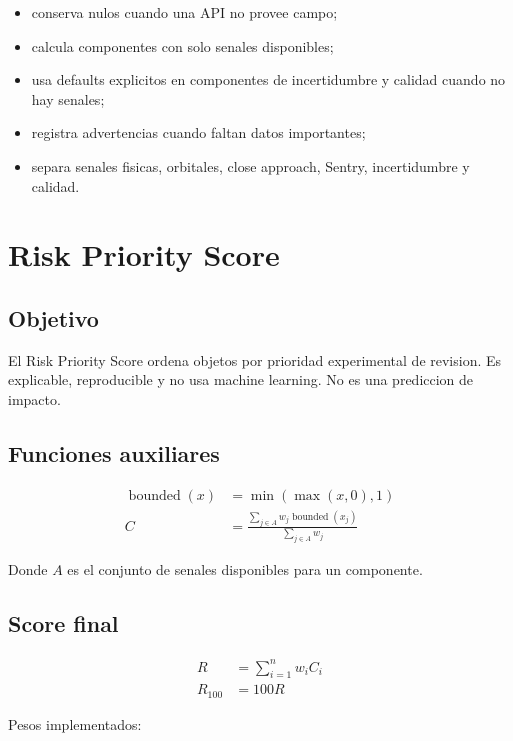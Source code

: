 \documentclass[11pt,letterpaper]{article}
\begin{document}
\begin{itemize}
  \item conserva nulos cuando una API no provee campo;
  \item calcula componentes con solo senales disponibles;
  \item usa defaults explicitos en componentes de incertidumbre y calidad cuando no hay senales;
  \item registra advertencias cuando faltan datos importantes;
  \item separa senales fisicas, orbitales, close approach, Sentry, incertidumbre y calidad.
\end{itemize}

\section{Risk Priority Score}

\subsection{Objetivo}

El Risk Priority Score ordena objetos por prioridad experimental de revision. Es explicable, reproducible y no usa machine learning. No es una prediccion de impacto.

\subsection{Funciones auxiliares}

\begin{align}
\operatorname{bounded}(x) &= \min(\max(x,0),1) \\
C &= \frac{\sum_{j \in A} w_j \operatorname{bounded}(x_j)}{\sum_{j \in A} w_j}
\end{align}

Donde \(A\) es el conjunto de senales disponibles para un componente.

\subsection{Score final}

\begin{align}
R &= \sum_{i=1}^{n} w_i C_i \\
R_{100} &= 100R
\end{align}

Pesos implementados:
\end{document}

